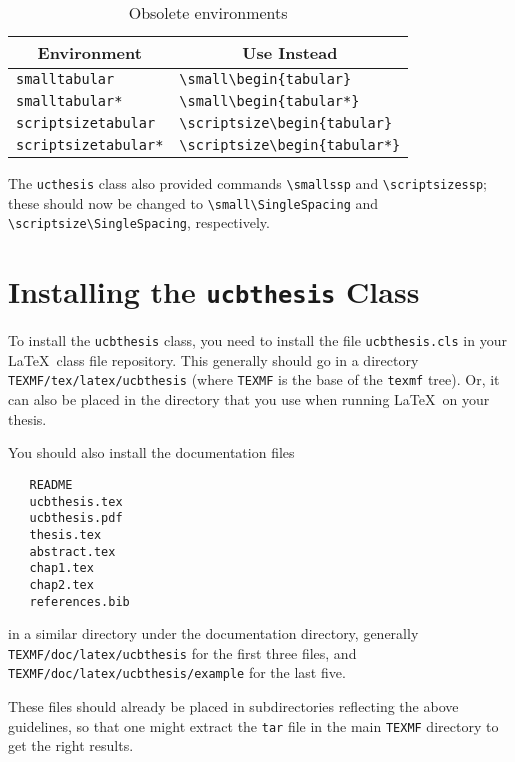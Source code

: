 \documentclass[11pt]{article}
\newcommand*{\pkg}[1]{\texttt{#1}}
\begin{document}
\begin{table}[htbp]
\centering
\begin{tabular}{l l}
  \toprule
  \multicolumn{1}{c}{Environment} & \multicolumn{1}{c}{Use Instead}\\
  \midrule
  \lstinline!smalltabular! & \lstinline!\small\begin{tabular}! \\
  \lstinline!smalltabular*! & \lstinline!\small\begin{tabular*}! \\
  \lstinline!scriptsizetabular! & \lstinline!\scriptsize\begin{tabular}! \\
  \lstinline!scriptsizetabular*! & \lstinline!\scriptsize\begin{tabular*}! \\
  \bottomrule
\end{tabular}
\caption{Obsolete environments}\label{obsolenv}
\end{table}

The \pkg{ucthesis} class also provided commands \verb!\smallssp! and\break
\verb!\scriptsizessp!; these should now be changed to
\verb!\small\SingleSpacing! and \verb!\scriptsize\SingleSpacing!,
respectively.

\section{Installing the \pkg{ucbthesis} Class}

To install the \pkg{ucbthesis} class, you need to install the file
\texttt{ucbthesis.cls} in your \LaTeX\ class file repository.  This
generally should go in a directory \lstinline!TEXMF/tex/latex/ucbthesis!
(where \lstinline!TEXMF!  is the base of the \texttt{texmf} tree).
Or, it can also be placed in the directory that you use when running
\LaTeX\ on your thesis.

You should also install the documentation files
\begin{verbatim}
   README
   ucbthesis.tex
   ucbthesis.pdf
   thesis.tex
   abstract.tex
   chap1.tex
   chap2.tex
   references.bib
\end{verbatim}
in a similar directory under the documentation directory, generally
\lstinline!TEXMF/doc/latex/ucbthesis! for the first three files, and
\lstinline!TEXMF/doc/latex/ucbthesis/example! for the last five.

These files should already be placed in subdirectories reflecting the above
guidelines, so that one might extract the \texttt{tar} file in the main
\lstinline!TEXMF! directory to get the right results.
\end{document}
